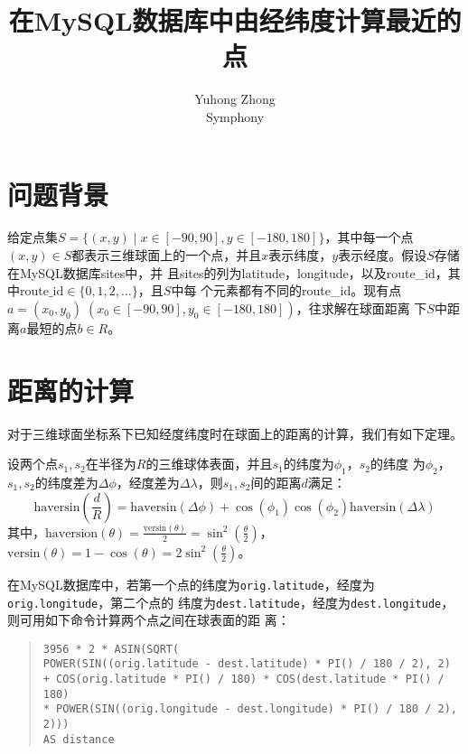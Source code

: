 
\title{\textbf{在MySQL数据库中由经纬度计算最近的点}}
\author{Yuhong Zhong\\[-0.5em]\scriptsize Symphony}
\date{}

\maketitle
\section{问题背景}
给定点集$S=\{(x,y)\mid x\in[-90, 90], y\in[-180,
180]\}$，其中每一个点$(x, y)\in
S$都表示三维球面上的一个点，并且$x$表示纬度，$y$表示经度。假设$S$存储在MySQL数据库sites中，并
且sites的列为latitude，longitude，以及route\_id，其中$\text{route\_id}\in\{0,1,2,\dots\}$，且$S$中每
个元素都有不同的route\_id。现有点$a=(x_0,y_0)\;(x_0\in[-90,90],y_0\in[-180,180])$，往求解在球面距离
下$S$中距离$a$最短的点$b\in R$。

\section{距离的计算}
对于三维球面坐标系下已知经度纬度时在球面上的距离的计算，我们有如下定理。

\begin{thm}[三维球体表面的距离]
  设两个点$s_1,s_2$在半径为$R$的三维球体表面，并且$s_1$的纬度为$\phi_1$，$s_2$的纬度
  为$\phi_2$，$s_1,s_2$的纬度差为$\Delta\phi$，经度差为$\Delta\lambda$，则$s_1,s_2$间的距离$d$满足：
\begin{displaymath}
  \mathrm{haversin}(\frac{d}{R})=\mathrm{haversin}(\Delta\phi)+\cos(\phi_1)\cos(\phi_2)\mathrm{haversin}(\Delta\lambda)
\end{displaymath}
其中，$\mathrm{haversion}(\theta)=\frac{\mathrm{versin}(\theta)}{2}=\sin^2(\frac{\theta}{2})$，
$\mathrm{versin}(\theta)=1-\cos(\theta)=2\sin^2(\frac{\theta}{2})$。
\end{thm}

在MySQL数据库中，若第一个点的纬度为\texttt{orig.latitude}，经度为\texttt{orig.longitude}，第二个点的
纬度为\texttt{dest.latitude}，经度为\texttt{dest.longitude}，则可用如下命令计算两个点之间在球表面的距
离：

\begin{quote}
  \texttt{3956 * 2 * ASIN(SQRT(\\
    POWER(SIN((orig.latitude - dest.latitude) * PI() / 180 / 2), 2)\\
    + COS(orig.latitude * PI() / 180) * COS(dest.latitude * PI() / 180)\\
    * POWER(SIN((orig.longitude - dest.longitude) * PI() / 180 / 2), 2)))\\
    AS distance}
\end{quote}

